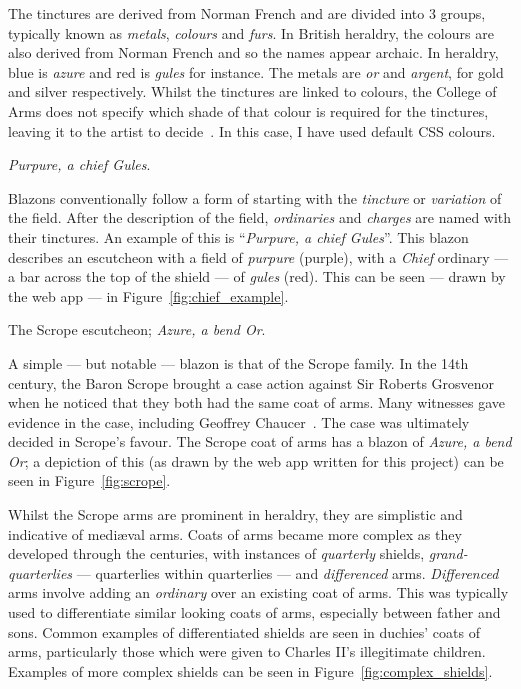 \documentclass[nobib, a4paper, twoside, justified]{tufte-book}
\makeatletter
\newcommand{\charges}{\glspl{charge}\@\xspace}
\makeatother
\begin{document}
The tinctures are derived from Norman French and are divided into 3 groups, typically known as
\textit{metals}, \textit{colours} and \textit{furs}. In British heraldry, the colours are also
derived from Norman French and so the names appear archaic. In heraldry, blue is \textit{azure} and
red is \textit{gules} for instance. The metals are \textit{or} and \textit{argent}, for gold and
silver respectively. Whilst the tinctures are linked to colours, the College of Arms does not
specify which shade of that colour is required for the tinctures, leaving it to the artist to
decide~\autocite{college_of_arms_faq}. In this case, I have used default CSS colours.

\begin{marginfigure}
  \centering
  \def\svgwidth{0.8\linewidth}
  
  \caption{\textit{Purpure, a chief Gules}.}\label{fig:chief_example}
\end{marginfigure}

Blazons conventionally follow a form of starting with the \textit{tincture} or \textit{variation}
of the field. After the description of the field, \textit{ordinaries} and \textit{\charges{}} are
named with their tinctures. An example of this is ``\textit{Purpure, a chief Gules}''. This blazon
describes an escutcheon with a field of \textit{purpure} (purple), with a \textit{Chief} ordinary
--- a bar across the top of the shield --- of \textit{gules} (red). This can be seen --- drawn by
the web app --- in Figure~\ref{fig:chief_example}.

\begin{marginfigure}
  \centering
  \def\svgwidth{0.8\linewidth}
  
  \caption{The Scrope escutcheon; \textit{Azure, a bend Or}.}\label{fig:scrope}
\end{marginfigure}

A simple --- but notable --- blazon is that of the Scrope family. In the 14th century, the Baron
Scrope brought a case action against Sir Roberts Grosvenor when he noticed that they both had the
same coat of arms. Many witnesses gave evidence in the case, including Geoffrey
Chaucer~\autocite{scrope_grosvenor}. The case was ultimately decided in Scrope's favour. The Scrope
coat of arms has a blazon of \textit{Azure, a bend Or}; a depiction of this (as drawn by the web
app written for this project) can be seen in Figure~\ref{fig:scrope}.

Whilst the Scrope arms are prominent in heraldry, they are simplistic and indicative of
medi\ae{}val arms. Coats of arms became more complex as they developed through the centuries, with
instances of \textit{quarterly} shields, \textit{grand-quarterlies} --- quarterlies within
quarterlies --- and \textit{differenced} arms. \textit{Differenced} arms involve adding an
\textit{ordinary} over an existing coat of arms. This was typically used to differentiate similar
looking coats of arms, especially between father and sons. Common examples of differentiated
shields are seen in duchies' coats of arms, particularly those which were given to Charles II's
illegitimate children. Examples of more complex shields can be seen in
Figure~\ref{fig:complex_shields}.
\end{document}
